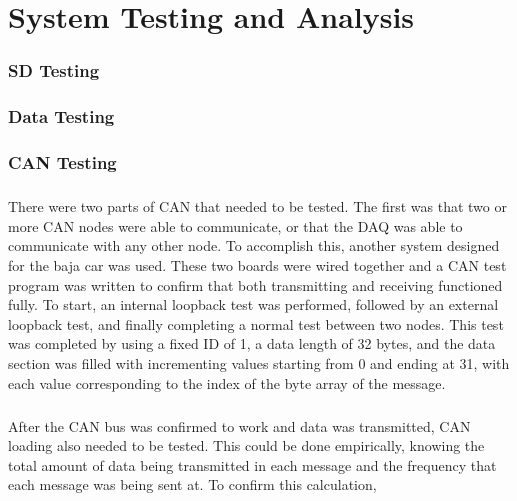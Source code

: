 \chapter{System Testing and Analysis}

\subsection{SD Testing}

\subsection{Data Testing}

\subsection{CAN Testing}

\paragraph{}
There were two parts of CAN that needed to be tested.
The first was that two or more CAN nodes were able to communicate, or that the DAQ was able to communicate with any other node.
To accomplish this, another system designed for the baja car was used.
These two boards were wired together and a CAN test program was written to confirm that both transmitting and receiving functioned fully.
To start, an internal loopback test was performed, followed by an external loopback test, and finally completing a normal test between two nodes.
This test was completed by using a fixed ID of 1, a data length of 32 bytes, and the data section was filled with incrementing values starting from 0 and ending at 31, with each value corresponding to the index of the byte array of the message.

\paragraph{}
After the CAN bus was confirmed to work and data was transmitted, CAN loading also needed to be tested.
This could be done empirically, knowing the total amount of data being transmitted in each message and the frequency that each message was being sent at.
To confirm this calculation, 
